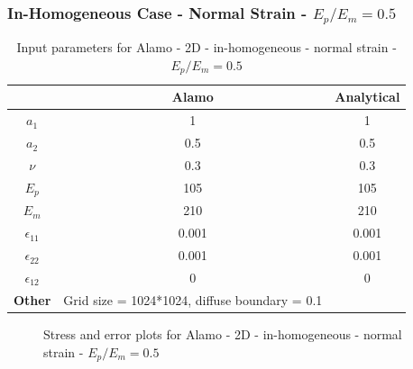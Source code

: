 \documentclass[12pt, a4paper]{report}
\begin{document}
\newpage

\subsubsection{In-Homogeneous Case - Normal Strain - $E_p/E_m = 0.5$}
\begin{table}[H]
    \centering
    \begin{tabular}{|c|c|c|}
        \hline
        & \textbf{Alamo} &\textbf{Analytical}\\
        \hline
        \textbf{$a_1$} & 1 & 1 \\
        \hline
        \textbf{$a_2$} & 0.5 & 0.5 \\
        \hline
        \textbf{$\nu$} & 0.3 & 0.3 \\
        \hline
        \textbf{$E_p$} & 105 & 105 \\
        \hline
        \textbf{$E_m$} & 210 & 210 \\
        \hline
        \textbf{$\epsilon_{11}$} & 0.001 & 0.001 \\
        \hline
        \textbf{$\epsilon_{22}$} & 0.001 & 0.001 \\
        \hline
        \textbf{$\epsilon_{12}$} & 0 & 0 \\
        \hline
        \textbf{Other} & Grid size = 1024*1024, diffuse boundary = 0.1&  \\
        \hline
    \end{tabular}
    \caption{Input parameters for Alamo - 2D - in-homogeneous - normal strain - $E_p/E_m = 0.5$}
\end{table}

\begin{figure}[htbp]
  \centering
  \hfill
  \caption{Stress and error plots for Alamo - 2D - in-homogeneous - normal strain - $E_p/E_m = 0.5$}
\end{figure}
\end{document}
